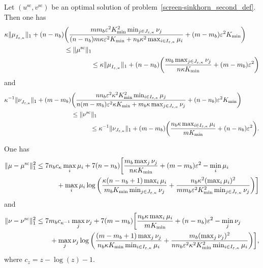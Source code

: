 \begin{lemma}
\label{lemma_bounds_on_marginals}
Let $(u^{\text{sc}}, v^{\text{sc}})$ be an optimal solution of problem~\eqref{screen-sinkhorn_second_def}.
Then one has 
\begin{align*}
 \kappa \|\mu_{I_{\varepsilon,\kappa}}^{\text{}}\|_1  + (n -n_b) &\bigg(\frac{mm_b\varepsilon^2 K_{\min}^2 \min_{j\in J_{\varepsilon, \kappa}} \nu_j}{ (n-n_b)m\kappa \varepsilon^2 K_{\min} + n_b\kappa^2 \max_{i\in I_{\varepsilon,\kappa}}\mu_i } + (m-m_b)\varepsilon^2K_{\min}\bigg)\\
 & \leq \|\mu^{\text{sc}}\|_1\\
 & \qquad \qquad \leq \kappa \|\mu_{I_{\varepsilon,\kappa}}^{\text{}}\|_1 + (n-n_b) \bigg(\frac{m_b\max_{j \in J_{\varepsilon,\kappa}} \nu_j}{n\kappa K_{\min}} + (m-m_b)\varepsilon
 ^2 \bigg)
\end{align*}
and 
\begin{align*}
\kappa^{-1} \|\nu_{J_{\varepsilon,\kappa}}^{\text{}}\|_1 + (m -m_b) &\bigg(\frac{nn_b\varepsilon^2\kappa^2K_{\min}^2 \min_{i\in I_{\varepsilon, \kappa}} \mu_j}{ n(m-m_b)\varepsilon^2 \kappa K_{\min} + m_b\kappa \max_{j\in J_{\varepsilon,\kappa}}\nu_j } + (n-n_b)\varepsilon^2K_{\min}\bigg)\\
&\leq \|\nu^{\text{sc}}\|_1\\
 & \qquad \quad \leq \kappa^{-1} \|\nu_{J_{\varepsilon,\kappa}}\|_1 + (m-m_b)\bigg(\frac{n_b\kappa \max_{i\in I_{\varepsilon,\kappa}}\mu_i}{m K_{\min}} + (n-n_b)\varepsilon^2\bigg).
\end{align*}
\end{lemma}
\begin{proposition}
\label{proposition_error_in_marginals}
One has %
\begin{align}
\label{maginal_mu}
{\|{\mu} -{\mu}^{\text{sc}}\|^2_1}&\leq 7 n_bc_\kappa \max_{i} \mu_i + 7 (n-n_b)\bigg[\frac{m_b\max_{j}\nu_j}{n\kappa K_{\min}} + (m- m_b) \varepsilon^2 - \min_{i}\mu_i \nonumber\\
&\qquad \quad  + \max_{i} \mu_i\log\bigg(\frac{\kappa(n-n_b+ 1)\max_{i} \mu_i}{m_b K_{\min}\min_{j \in J_{\varepsilon,\kappa}}\nu_j} + \frac{n_b\kappa^2(\max_{i} \mu_i)^2}{mm_b\varepsilon^2K_{\min}^2\min_{j \in J_{\varepsilon,\kappa}}\nu_j}\bigg)\bigg]
\end{align}
and 
\begin{align}
\label{maginal_nu}
{\|{\nu} -{\nu}^{\text{sc}}\|^2_1} &\leq 7 m_bc_{\kappa^{-1}}\max_{j} \nu_j + 7(m-m_b)\bigg[\frac{n_b\kappa\max_{i}\mu_i}{m K_{\min}} + (n- n_b) \varepsilon^2 - \min_{j}\nu_j\nonumber\\ 
&\qquad  + \max_{j} \nu_j\log\bigg(\frac{(m-m_b+ 1)\max_{j} \nu_j}{n_b \kappa K_{\min}\min_{i \in I_{\varepsilon,\kappa}}\mu_i} + \frac{m_b(\max_{j} \nu_j)^2}{nn_b\varepsilon^2\kappa^2K_{\min}^2\min_{i \in I_{\varepsilon,\kappa}}\mu_i}\bigg)\bigg],
\end{align}
where $c_z = z-\log(z)-1.$
\end{proposition}
